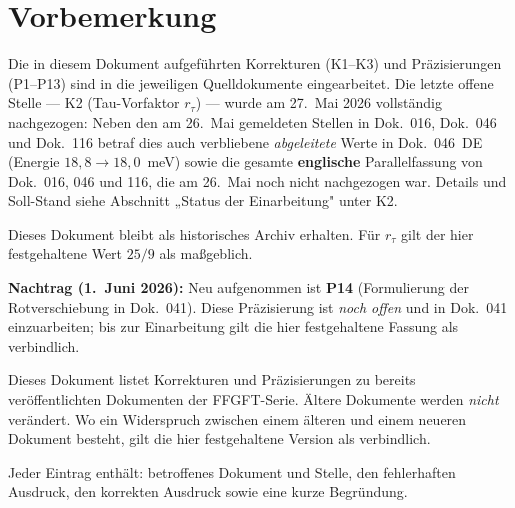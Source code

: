 
\section*{Vorbemerkung}

\begin{tcolorbox}[colback=green!6!white, colframe=green!55!black, title={Status: K1--K3, P1--P13 eingearbeitet --- P14 offen (Stand 1.~Juni 2026)}]
Die in diesem Dokument aufgeführten Korrekturen (K1–K3) und
Präzisierungen (P1–P13) sind in die jeweiligen Quelldokumente
eingearbeitet. Die letzte offene Stelle --- K2 (Tau-Vorfaktor
$r_\tau$) --- wurde am 27.~Mai 2026 vollständig nachgezogen: Neben den am
26.~Mai gemeldeten Stellen in Dok.~016, Dok.~046 und Dok.~116 betraf dies
auch verbliebene \emph{abgeleitete} Werte in Dok.~046~DE (Energie
$18{,}8 \to 18{,}0$~meV) sowie die gesamte \textbf{englische} Parallelfassung
von Dok.~016, 046 und 116, die am 26.~Mai noch nicht nachgezogen war.
Details und Soll-Stand siehe Abschnitt „Status der Einarbeitung" unter K2.

Dieses Dokument bleibt als historisches Archiv erhalten.
Für $r_\tau$ gilt der hier festgehaltene Wert $25/9$ als maßgeblich.

\medskip

\textbf{Nachtrag (1.~Juni 2026):} Neu aufgenommen ist \textbf{P14}
(Formulierung der Rotverschiebung in Dok.~041). Diese Präzisierung ist
\emph{noch offen} und in Dok.~041 einzuarbeiten; bis zur Einarbeitung gilt
die hier festgehaltene Fassung als verbindlich.
\end{tcolorbox}

\bigskip

Dieses Dokument listet Korrekturen und Präzisierungen zu bereits
veröffentlichten Dokumenten der FFGFT-Serie. Ältere Dokumente werden
\emph{nicht} verändert. Wo ein Widerspruch zwischen einem älteren und
einem neueren Dokument besteht, gilt die hier festgehaltene Version als
verbindlich.

Jeder Eintrag enthält: betroffenes Dokument und Stelle, den fehlerhaften
Ausdruck, den korrekten Ausdruck sowie eine kurze Begründung.

